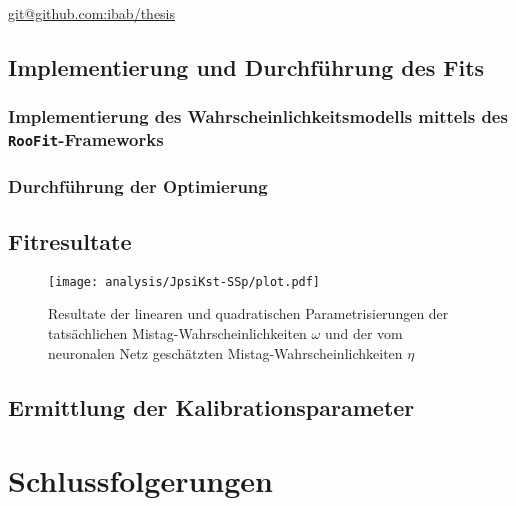 \url{git@github.com:ibab/thesis}

\subsection{Implementierung und Durchführung des Fits}

\subsubsection{Implementierung des Wahrscheinlichkeitsmodells mittels des \texttt{RooFit}-Frameworks}


\subsubsection{Durchführung der Optimierung}

\subsection{Fitresultate}

\begin{figure}
  \texttt{[image: analysis/JpsiKst-SSp/plot.pdf]}
  \caption{Resultate der linearen und quadratischen Parametrisierungen der tatsächlichen Mistag-Wahrscheinlichkeiten $\omega$ und der vom neuronalen Netz geschätzten Mistag-Wahrscheinlichkeiten $\eta$}
\end{figure}


\subsection{Ermittlung der Kalibrationsparameter}


\section{Schlussfolgerungen}

